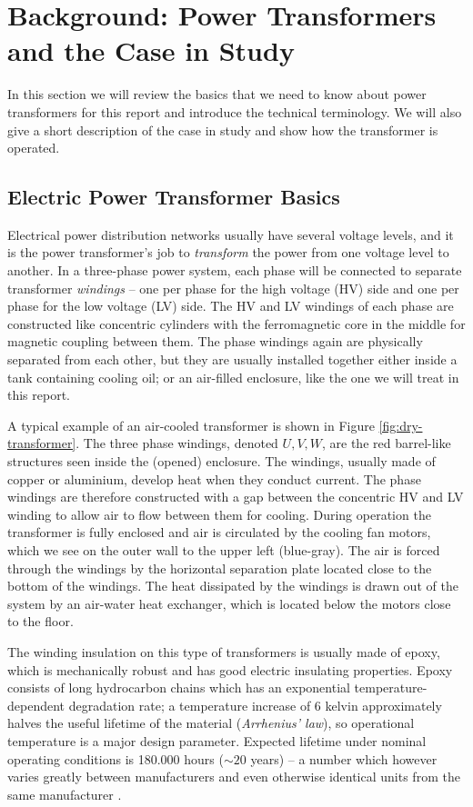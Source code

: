 \documentclass[]{article}
\begin{document}
\section{Background: Power Transformers and the Case in Study}
In this section we will review the basics that we need to know about power transformers for this report and introduce the technical terminology. We will also give a short description of the case in study and show how the transformer is operated.

\subsection{Electric Power Transformer Basics} \label{sec:transformers}
Electrical power distribution networks usually have several voltage levels, and it is the power transformer's job to \textit{transform} the power from one voltage level to another. In a three-phase power system, each phase will be connected to separate transformer \textit{windings} -- one per phase for the high voltage (HV) side and one per phase for the low voltage (LV) side. The HV and LV windings of each phase are constructed like concentric cylinders with the ferromagnetic core in the middle for magnetic coupling between them. The phase windings again are physically separated from each other, but they are usually installed together either inside a tank containing cooling oil; or an air-filled enclosure, like the one we will treat in this report. 

A typical example of an air-cooled transformer is shown in Figure \ref{fig:dry-transformer}. The three phase windings, denoted $U, V, W$, are the red barrel-like structures seen inside the (opened) enclosure. The windings, usually made of copper or aluminium, develop heat when they conduct current. The phase windings are therefore constructed with a gap between the concentric HV and LV winding to allow air to flow between them for cooling. During operation the transformer is fully enclosed and air is circulated by the cooling fan motors, which we see on the outer wall to the upper left (blue-gray). The air is forced through the windings by the horizontal separation plate located close to the bottom of the windings. The heat dissipated by the windings is drawn out of the system by an air-water heat exchanger, which is located below the motors close to the floor. 

The winding insulation on this type of transformers is usually made of epoxy, which is mechanically robust and has good electric insulating properties. Epoxy consists of long hydrocarbon chains which has an exponential temperature-dependent degradation rate; a temperature increase of 6 kelvin approximately halves the useful lifetime of the material (\textit{Arrhenius' law}), so operational temperature is a major design parameter. Expected lifetime under nominal operating conditions is 180.000 hours ($\sim 20$ years) -- a number which however varies greatly between manufacturers and even otherwise identical units from the same manufacturer \cite{iec60076-12}.
\end{document}

